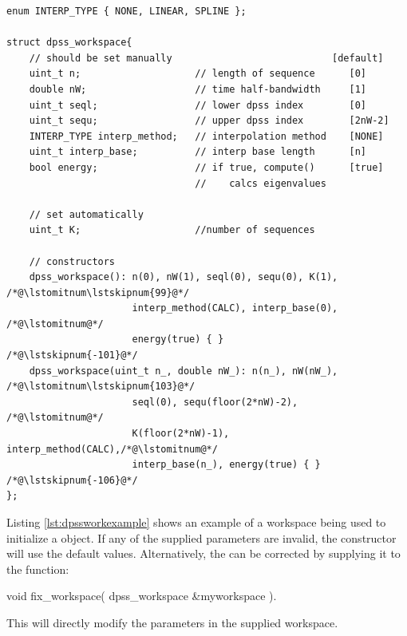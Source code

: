\begin{lstlisting}[label=lst:dpsswork,caption=The \texttt{dpss\_workspace} structure]
enum INTERP_TYPE { NONE, LINEAR, SPLINE };

struct dpss_workspace{
    // should be set manually                            [default]
    uint_t n;                    // length of sequence      [0]
    double nW;                   // time half-bandwidth     [1]
    uint_t seql;                 // lower dpss index        [0]
    uint_t sequ;                 // upper dpss index        [2nW-2]
    INTERP_TYPE interp_method;   // interpolation method    [NONE]
    uint_t interp_base;          // interp base length      [n]
    bool energy;                 // if true, compute()      [true]
                                 //    calcs eigenvalues

    // set automatically
    uint_t K;                    //number of sequences
    
    // constructors
    dpss_workspace(): n(0), nW(1), seql(0), sequ(0), K(1), /*@\lstomitnum\lstskipnum{99}@*/
                      interp_method(CALC), interp_base(0), /*@\lstomitnum@*/
                      energy(true) { }                     /*@\lstskipnum{-101}@*/
    dpss_workspace(uint_t n_, double nW_): n(n_), nW(nW_), /*@\lstomitnum\lstskipnum{103}@*/
                      seql(0), sequ(floor(2*nW)-2),        /*@\lstomitnum@*/
                      K(floor(2*nW)-1), interp_method(CALC),/*@\lstomitnum@*/ 
                      interp_base(n_), energy(true) { }    /*@\lstskipnum{-106}@*/
};
\end{lstlisting}
\medskip

Listing \ref{lst:dpssworkexample} shows an example of a workspace being used to initialize a  object.  If any of the supplied parameters are invalid, the  constructor will use the default values.  Alternatively, the  can be corrected by supplying it to the function:
\begin{lstplainblock}
void fix_workspace( dpss_workspace &myworkspace ).
\end{lstplainblock}
This will directly modify the parameters in the supplied workspace.
\medskip

